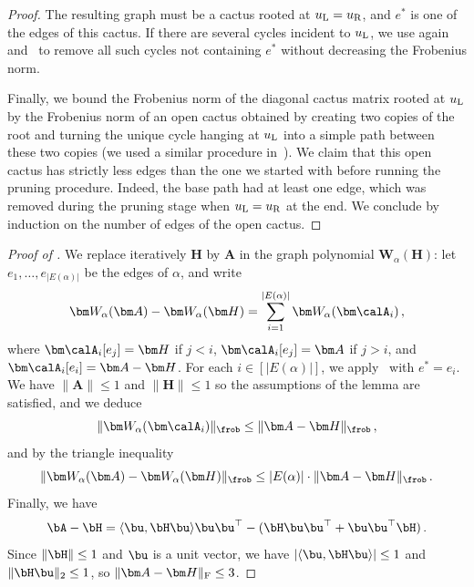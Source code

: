 \begin{proof}
    The resulting graph must be a cactus rooted at $u_{\textnormal L} = u_{\textnormal R}$, and $e^*$ is
    one of the edges of this cactus.
    If there are several cycles
    incident to $u_{\textnormal L}$,
    we use again~ and~ to remove all such cycles
    not containing $e^*$ without
    decreasing the Frobenius norm.
    
    Finally, we bound the Frobenius norm of
    the diagonal cactus matrix rooted at
    $u_{\textnormal L}$ by the
    Frobenius norm of an open cactus
    obtained by creating two copies
    of the root and turning the unique
    cycle hanging at $u_{\textnormal L}$ into a simple path between
    these two copies (we used a similar procedure
    in~). We claim that this open cactus has strictly less edges
    than the one we started with
    before running the pruning procedure. Indeed,
    the base path had at least one edge, which
    was removed during the pruning stage when
    $u_{\textnormal L} = u_{\textnormal R}$ at the end. We
    conclude by induction on the
    number of edges of the open cactus.
\end{proof}

\begin{proof}[Proof of {}]
    We replace iteratively $\bm H$ by
    $\bm A$ in the graph polynomial $\bm W_\alpha(\bm H)$: let $e_1, \ldots, e_{|E(\alpha)|}$
    be the edges of $\alpha$, and write
    \[
        \bm W_\alpha(\bm A) - \bm W_\alpha(\bm H) = \sum_{i=1}^{|E(\alpha)|} \bm W_\alpha(\bm \calA_{i})\,,
    \]
    where $\bm \calA_i[e_j] = \bm H$ if $j<i$, $\bm \calA_i[e_j] = \bm A$ if $j>i$, and $\bm \calA_i[e_i] = \bm A - \bm H$.
    For each $i\in [|E(\alpha)|]$, we apply~ with $e^* = e_i$.
    We have $\|\bm A\|\le 1$ and $\|\bm H\|\le 1$
    so the assumptions of the lemma are satisfied, and we deduce
    \[
        \|\bm W_\alpha(\bm \calA_i)\|_\frob\le \|\bm A - \bm H \|_\frob\,,
    \]
    and by the triangle inequality
    \[
        \|\bm W_\alpha(\bm A) - \bm W_\alpha(\bm H)\|_\frob\le |E(\alpha)|\cdot \|\bm A - \bm H\|_\frob\,.
    \]
    Finally, we have
    \[
        \bA - \bH = \langle \bu,\bH \bu\rangle \bu\bu^\top - (\bH \bu\bu^\top + \bu\bu^\top \bH)\,.
    \]
    Since $\|\bH\|\le 1$ and $\bu$ is a unit vector, we have $|\langle \bu, \bH \bu\rangle|\le 1$ and $\|\bH \bu\|_2\le 1$, so $\|\bm A - \bm H\|_{\textnormal F}\le 3$.
\end{proof}

